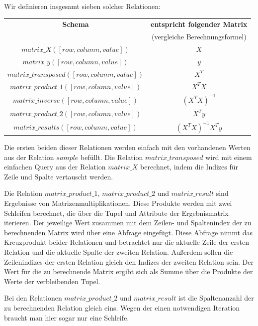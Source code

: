 Wir definieren insgesamt sieben solcher Relationen:
\begin{center}
  \begin{tabular}{|c|c|}\hline
    \textbf{Schema} & \textbf{entspricht folgender Matrix} \\
     &  (vergleiche Berechnungsformel) \\ \hline
    $matrix\_X([row, column, value])$ & $X$ \\ \hline
    $matrix\_y([row, column, value])$ & $y$ \\ \hline
    $matrix\_transposed([row, column, value])$ & $X^T$ \\ \hline
    $matrix\_product\_1([row, column, value])$ & $X^T X$ \\ \hline
    $matrix\_inverse([row, column, value])$ & $(X^T X)^{-1}$ \\ \hline
    $matrix\_product\_2([row, column, value])$ & $X^T y$ \\ \hline
    $matrix\_results([row, column, value])$ & $(X^T X)^{-1} X^T y$ \\ \hline
  \end{tabular}
\end{center}

Die ersten beiden dieser Relationen werden einfach mit den vorhandenen Werten aus der Relation $sample$ befüllt. Die Relation $matrix\_transposed$ wird mit einem einfachen Query aus der Relation $matrix\_X$ berechnet, indem die Indizes für Zeile und Spalte vertauscht werden.

Die Relation $matrix\_product\_1$, $matrix\_product\_2$ und $matrix\_result$ sind Ergebnisse von Matrizenmultiplikationen. Diese Produkte werden mit zwei Schleifen berechnet, die über die Tupel und Attribute der Ergebnismatrix iterieren. Der jeweilige Wert zusammen mit dem Zeilen- und Spaltenindex der zu berechnenden Matrix wird über eine Abfrage eingefügt. Diese Abfrage nimmt das Kreuzprodukt beider Relationen und betrachtet nur die aktuelle Zeile der ersten Relation und die aktuelle Spalte der zweiten Relation. Außerdem sollen die Zeilenindizes der ersten Relation gleich den Indizes der zweiten Relation sein. Der Wert für die zu berechnende Matrix ergibt sich als Summe über die Produkte der Werte der verbleibenden Tupel.

Bei den Relationen $matrix\_product\_2$ und $matrix\_result$ ist die Spaltenanzahl der zu berechnenden Relation gleich eins. Wegen der einen notwendigen Iteration braucht man hier sogar nur eine Schleife.

